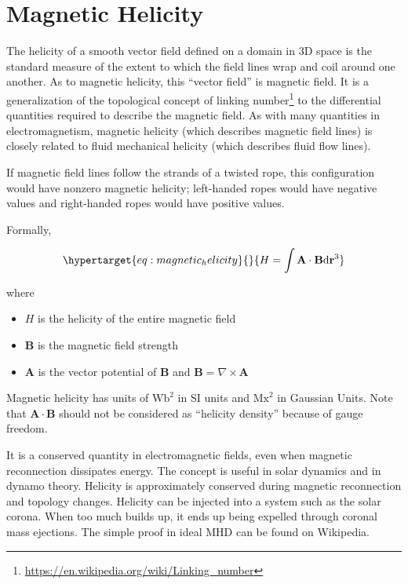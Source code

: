 \documentclass[
  notoc %
]{tufte-book}
\DeclareRobustCommand{\href}[2]{#2\footnote{\url{#1}}}
\providecommand{\tightlist}{%
  \setlength{\itemsep}{0pt}\setlength{\parskip}{0pt}
}
\begin{document}
\hypertarget{magnetic-helicity}{%
\section{Magnetic Helicity}\label{magnetic-helicity}}

The helicity of a smooth vector field defined on a domain in 3D space is
the standard measure of the extent to which the field lines wrap and
coil around one another. As to magnetic helicity, this ``vector field''
is magnetic field. It is a generalization of the topological concept of
\href{https://en.wikipedia.org/wiki/Linking_number}{linking number} to
the differential quantities required to describe the magnetic field. As
with many quantities in electromagnetism, magnetic helicity (which
describes magnetic field lines) is closely related to fluid mechanical
helicity (which describes fluid flow lines).

If magnetic field lines follow the strands of a twisted rope, this
configuration would have nonzero magnetic helicity; left-handed ropes
would have negative values and right-handed ropes would have positive
values.

Formally,

\begin{equation}\protect\hypertarget{eq:magnetic_helicity}{}{
H=\int\mathbf{A}\cdot\mathbf{B}\mathrm{d}\mathbf{r}^3
}\label{eq:magnetic_helicity}\end{equation}

where

\begin{itemize}
\tightlist
\item
  \(H\) is the helicity of the entire magnetic field
\item
  \(\mathbf{B}\) is the magnetic field strength
\item
  \(\mathbf{A}\) is the vector potential of \(\mathbf{B}\) and
  \(\mathbf{B}=\nabla\times\mathbf{A}\)
\end{itemize}

Magnetic helicity has units of \(\text{Wb}^2\) in SI units and
\(\text{Mx}^2\) in Gaussian Units. Note that
\(\mathbf{A}\cdot\mathbf{B}\) should not be considered as ``helicity
density'' because of gauge freedom.

It is a conserved quantity in electromagnetic fields, even when magnetic
reconnection dissipates energy. The concept is useful in solar dynamics
and in dynamo theory. Helicity is approximately conserved during
magnetic reconnection and topology changes. Helicity can be injected
into a system such as the solar corona. When too much builds up, it ends
up being expelled through coronal mass ejections. The simple proof in
ideal MHD can be found on Wikipedia.
\end{document}
